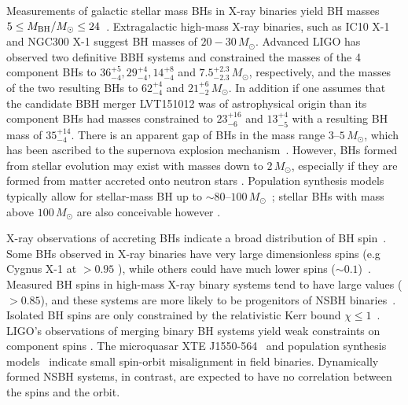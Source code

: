 Measurements of galactic stellar mass
\acp{BH} in X-ray binaries yield \ac{BH} masses
$5 \le M_{\rm BH}/{M_{\odot}}\le 24$~\citep{Farr:2010tu,Ozel:2010su,Merloni:2008tj,Wiktorowicz:2013dua}.
Extragalactic high-mass X-ray binaries, such as IC10 X-1 and NGC300 X-1 suggest
BH masses of $20-30\,{M_{\odot}}$. Advanced \ac{LIGO} has observed two definitive \ac{BBH} systems and
constrained the masses of the 4 component \acp{BH} to $36_{-4}^{+5},
29_{-4}^{+4}, 14_{-4}^{+8}$ and $7.5_{-2.3}^{+2.3}\,M_{\odot}$, respectively, and
the masses of the two resulting \acp{BH} to $62_{-4}^{+4}$ and
$21_{-2}^{+6}\,M_{\odot}$. In addition if one assumes that the candidate \ac{BBH} merger LVT151012
was of astrophysical origin than its component \acp{BH} had masses constrained to $23_{-6}^{+16}$
and $13_{-5}^{+4}$ with a resulting \ac{BH} mass of $35_{-4}^{+14}$.
There is an apparent gap of \acp{BH} in the mass range $3$--$5\,
{M_{\odot}}$, which has been ascribed to the supernova explosion
mechanism~\citep{Belczynski:2011bn,Fryer:2011cx}. However, \acp{BH} formed from stellar
evolution may exist with masses down to $2\,{M_{\odot}}$, especially if they are formed
from matter accreted onto neutron stars \citep{O'Shaughnessy:2005qc}.
Population synthesis models typically allow for stellar-mass \ac{BH} up to
$\sim 80\text{--}100\,{M_{\odot}}$~\citep{Fryer:2011cx,Belczynski:2009xy,Dominik:2012kk};
stellar \acp{BH} with mass above $100\,{M_{\odot}}$ are also conceivable however
\citep{Belczynski:2014iua,deMink:2015yea}.

X-ray observations of accreting \acp{BH} indicate a broad
distribution of \ac{BH} spin~\citep{Miller:2009cw,Shafee:2005ef,
McClintock:2006xd,Liu:2008tk,Gou:2009ks,Davis:2006cm, Li:2004aq,Miller:2014aaa}.
Some \acp{BH} observed in X-ray binaries have very large dimensionless spins
(e.g Cygnus X-1 at $>0.95$ \citep{2012MNRAS.424..217F,Gou:2011nq}), while others
could have much lower spins ($\sim 0.1$)~\citep{McClintock:2011zq}. Measured
\ac{BH} spins in high-mass X-ray binary systems tend to have large values ($>0.85$), and
these systems are more likely to be progenitors of \ac{NSBH}
binaries~\citep{McClintock:2013vwa}.  Isolated \ac{BH} spins are only constrained
by the relativistic Kerr bound ${\chi} \leq 1$~\cite{misner2017gravitation}.
LIGO's observations of merging binary \ac{BH} systems yield
weak constraints on component spins \citep{TheLIGOScientific:2016wfe,Abbott:2016nmj,TheLIGOScientific:2016pea}.
The microquasar XTE J1550-564~\citep{Steiner:2011vr} and population synthesis
models~\citep{Fragos:2010tm} indicate small spin-orbit misalignment in
field binaries.
Dynamically formed \ac{NSBH} systems, in contrast, are expected to
have no correlation between the spins and the orbit.

